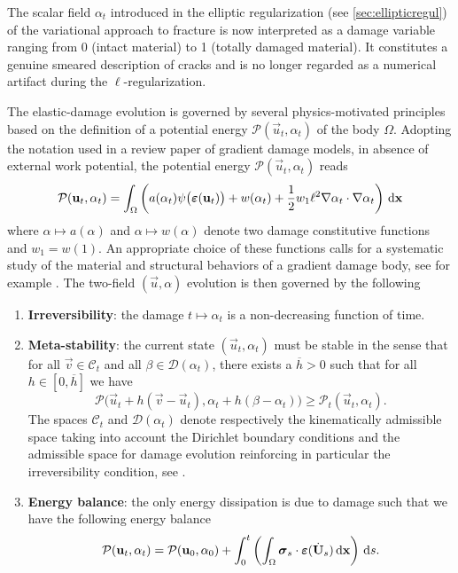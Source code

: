 The scalar field $\alpha_t$ introduced in the elliptic regularization (see \cref{sec:ellipticregul}) of the variational approach to fracture is now interpreted as a damage variable ranging from 0 (intact material) to 1 (totally damaged material). It constitutes a genuine smeared description of cracks and is no longer regarded as a numerical artifact during the $\ell$-regularization.

The elastic-damage evolution is governed by several physics-motivated principles based on the definition of a potential energy $\mathcal{P}(\vec{u}_t,\alpha_t)$ of the body $\Omega$. Adopting the notation used in a review paper \cite{PhamAmorMarigoMaurini:2011} of gradient damage models, in absence of external work potential, the potential energy $\mathcal{P}(\vec{u}_t,\alpha_t)$ reads
\begin{equation} \label{eq:Pgd}
\mathcal{P}(\vec{u}_t,\alpha_t)=\int_\Omega\left( a(\alpha_t)\psi\bigl(\eps(\vec{u}_t)\bigr)+w(\alpha_t)+\frac{1}{2}w_1\ell^2\nabla\alpha_t\cdot\nabla\alpha_t\right)\dx
\end{equation}
where $\alpha\mapsto a(\alpha)$ and $\alpha\mapsto w(\alpha)$ denote two damage constitutive functions and $w_1=w(1)$. An appropriate choice of these functions calls for a systematic study of the material and structural behaviors of a gradient damage body, see for example \cite{PhamMarigo:2013,PhamAmorMarigoMaurini:2011,PhamMarigoMaurini:2011}. The two-field $(\vec{u},\alpha)$ evolution is then governed by the following
\begin{definition} \label{def:qsgraddama} \noindent
\begin{enumerate}
\item \textbf{Irreversibility}: the damage $t\mapsto\alpha_t$ is a non-decreasing function of time.

\item \textbf{Meta-stability}: the current state $(\vec{u}_t,\alpha_t)$ must be stable in the sense that for all $\vec{v}\in\mathcal{C}_t$ and all $\beta\in\mathcal{D}(\alpha_t)$, there exists a $\overline{h}>0$ such that for all $h\in[0,\overline{h}]$ we have
\begin{equation} \label{eq:qsstability}
\mathcal{P}\bigl(\vec{u}_t+h(\vec{v}-\vec{u}_t),\alpha_t+h(\beta-\alpha_t)\bigr)\geq\mathcal{P}_t(\vec{u}_t,\alpha_t).
\end{equation}
The spaces $\mathcal{C}_t$ and $\mathcal{D}(\alpha_t)$ denote respectively the kinematically admissible space taking into account the Dirichlet boundary conditions and the admissible space for damage evolution reinforcing in particular the irreversibility condition, see \cite{PhamAmorMarigoMaurini:2011}.

\item \textbf{Energy balance}: the only energy dissipation is due to damage such that we have the following energy balance
\begin{equation} \label{eq:qseb}
\mathcal{P}(\vec{u}_t,\alpha_t)=\mathcal{P}(\vec{u}_0,\alpha_0)+\int_0^t\left(\int_\Omega\sig_s\cdot\eps(\dot{\vec{U}}_s)\dx\right)\D{s}.
\end{equation}
\end{enumerate}
\end{definition}

